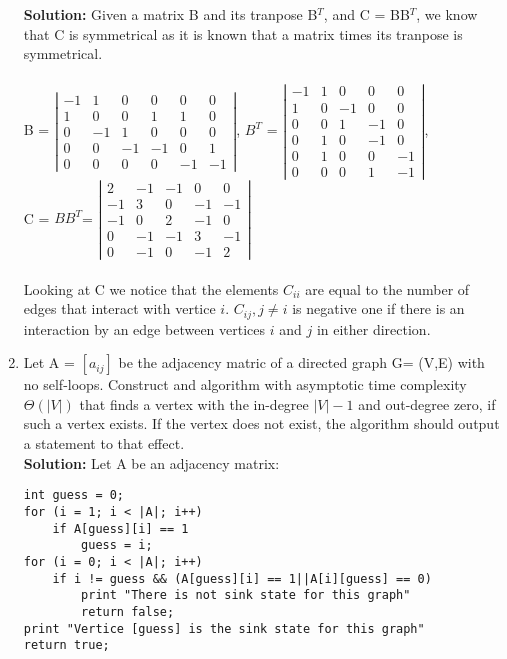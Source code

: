 \documentclass[11pt]{article}
\begin{document}
\begin{enumerate}
	
\textbf{Solution:} Given a matrix B and its tranpose B$^T$, and C = BB$^T$, we know that C is symmetrical as it is known that a matrix times its tranpose is symmetrical.\\\\
B = $\left| \begin{array}{cccccc} -1 & 1 & 0 & 0 & 0 & 0 \\ 1 & 0 & 0 & 1 & 1 & 0 \\0 & -1 & 1 & 0 & 0 & 0 \\0 & 0 & -1 & -1 & 0 & 1 \\ 0 & 0 & 0 & 0 & -1 & -1 \end{array} \right|$,
$B^T$ = $\left| \begin{array}{ccccc} -1 & 1 & 0 & 0 & 0 \\ 1 & 0 & -1 & 0 & 0 \\0 & 0 & 1 & -1 & 0 \\0 & 1 & 0 & -1 & 0\\0 & 1 & 0 & 0 & -1\\0 & 0 & 0 & 1 & -1 \end{array} \right|$,\\
C = $BB^T$= $\left| \begin{array}{ccccc} 2 & -1 & -1 & 0 & 0 \\ -1 & 3 & 0 & -1 & -1 \\ -1 & 0 & 2 & -1 & 0 \\ 0 & -1 & -1 & 3 & -1 \\ 0 & -1 & 0 & -1 & 2 \end{array} \right|$
\\\\Looking at C we notice that the elements $C_{ii}$ are equal to the number of edges that interact with vertice $i$. $C_{ij}, j \ne i$ is negative one if there is an interaction by an edge between vertices $i$ and $j$ in either direction.

\item Let A = $[a_{ij}]$ be the adjacency matric of a directed graph G= (V,E) with no self-loops. Construct and algorithm with asymptotic time complexity $\Theta(|V|)$ that finds a vertex with the in-degree $|V| - 1$ and out-degree zero, if such a vertex exists. If the vertex does not exist, the algorithm should output a statement to that effect.\\


\textbf{Solution:} Let A be an adjacency matrix:
\begin{verbatim}
int guess = 0;
for (i = 1; i < |A|; i++)
    if A[guess][i] == 1
        guess = i;
for (i = 0; i < |A|; i++)
    if i != guess && (A[guess][i] == 1||A[i][guess] == 0)
        print "There is not sink state for this graph"
        return false;
print "Vertice [guess] is the sink state for this graph"
return true;
\end{verbatim}


\end{enumerate}
\end{document}
